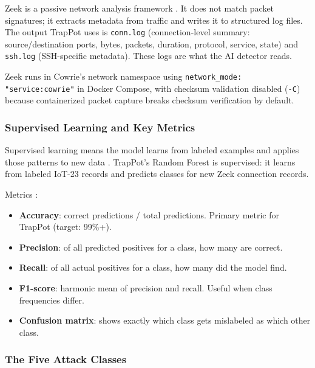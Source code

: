Zeek is a passive network analysis framework \cite{9001068}. It does not match packet signatures; it extracts metadata from traffic and writes it to structured log files. The output TrapPot uses is \texttt{conn.log} (connection-level summary: source/destination ports, bytes, packets, duration, protocol, service, state) and \texttt{ssh.log} (SSH-specific metadata). These logs are what the AI detector reads.

Zeek runs in Cowrie's network namespace using \texttt{network\_mode: "service:cowrie"} in Docker Compose, with checksum validation disabled (\texttt{-C}) because containerized packet capture breaks checksum verification by default.

\subsubsection{Supervised Learning and Key Metrics}
\label{subsub:supervised_learning}

Supervised learning means the model learns from labeled examples and applies those patterns to new data \cite{hopf2021supervised,dimauro2021supervised}. TrapPot's Random Forest is supervised: it learns from labeled IoT-23 records and predicts classes for new Zeek connection records.

Metrics \cite{confusion2023pmc,mary2024network}:

\begin{itemize}
\item \textbf{Accuracy}: correct predictions / total predictions. Primary metric for TrapPot (target: 99\%+).
\item \textbf{Precision}: of all predicted positives for a class, how many are correct.
\item \textbf{Recall}: of all actual positives for a class, how many did the model find.
\item \textbf{F1-score}: harmonic mean of precision and recall. Useful when class frequencies differ.
\item \textbf{Confusion matrix}: shows exactly which class gets mislabeled as which other class.
\end{itemize}

\subsubsection{The Five Attack Classes}
\label{subsub:attack_types}

